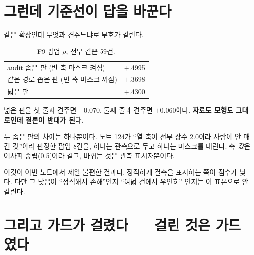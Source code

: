 \documentclass[10pt]{article}
\begin{document}

\section{그런데 기준선이 답을 바꾼다}

같은 확장인데 무엇과 견주느냐로 부호가 갈린다.

\begin{table}[t]
\centering\tsize
\caption{F9 팝업 $\rho$, 전부 같은 59건.}
\begin{tabular}{lr}
\toprule
audit 좁은 판 (빈 축 마스크 켜짐) & $+$.4995 \\
같은 경로 좁은 판 (빈 축 마스크 꺼짐) & $+$.3698 \\
넓은 판 & $+$.4300 \\
\bottomrule
\end{tabular}
\end{table}

넓은 판을 첫 줄과 견주면 $-$0.070, 둘째 줄과 견주면 $+$0.060이다.
\textbf{자료도 모형도 그대로인데 결론이 반대가 된다.}

두 좁은 판의 차이는 하나뿐이다. 노트 124가 ``열 축이 전부 상수 2.0이라
사람이 안 매긴 것''이라 판정한 팝업 8건을, 하나는 관측으로 두고 하나는
마스크를 내린다. 축 \emph{값}은 어차피 중립(0.5)이라 같고, 바뀌는 것은
관측 표시자뿐이다.


이것이 이번 노트에서 제일 불편한 결과다. 정직하게 결측을 표시하는 쪽이
점수가 낮다. 다만 그 낮음이 ``정직해서 손해''인지 ``여덟 건에서 우연히''
인지는 이 표본으로 안 갈린다.

\section{그리고 가드가 걸렸다 --- 걸린 것은 가드였다}
\end{document}
